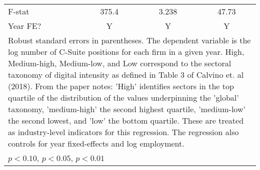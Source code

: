 \begin{table}[htbp]
\begin{tabular}{l*{3}{c}}
F-stat              &       375.4         &       3.238         &       47.73         \\
Year FE?            &           Y         &           Y         &           Y         \\
\bottomrule
\multicolumn{4}{l}{\footnotesize Robust standard errors in parentheses. The dependent variable is the log number of C-Suite positions for each firm in a given year. High, Medium-high, Medium-low, and Low correspond to the sectoral taxonomy of digital intensity as defined in Table 3 of  Calvino et. al (2018). From the paper notes: 'High' identifies sectors in the top quartile of the distribution of the values underpinning the 'global' taxonomy, 'medium-high' the second highest quartile, 'medium-low' the second lowest, and 'low' the bottom quartile. These are treated as industry-level indicators for this regression. The regression also controls for year fixed-effects and log employment.}\\
\multicolumn{4}{l}{\footnotesize \sym{*} \(p<0.10\), \sym{**} \(p<0.05\), \sym{***} \(p<0.01\)}\\
\end{tabular}
\end{table}
